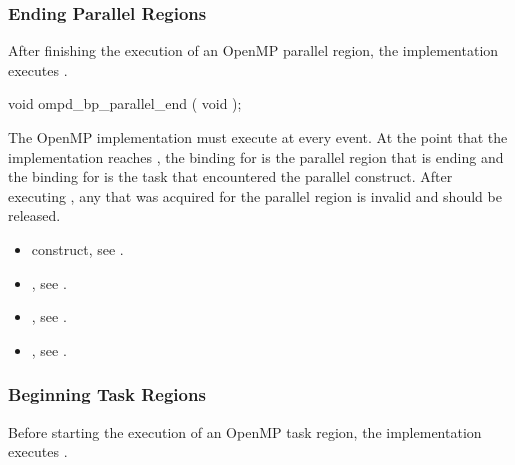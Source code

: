 \subsubsection{Ending Parallel Regions}
\label{subsubsec:ompd_bp_parallel_end}

\summary
After finishing the execution of an OpenMP parallel region, 
the implementation executes .

\format
\begin{cspecific}
\begin{ompSyntax}
void ompd_bp_parallel_end ( void );
\end{ompSyntax}
\end{cspecific}


\descr
The OpenMP implementation must execute  at 
every  event. At the point that the implementation reaches 
, the binding for  
is the parallel region that is ending and the binding for 
 is the task that encountered the 
parallel construct. After executing , any 
 that was acquired for the parallel region is 
invalid and should be released.

\crossreferences
\begin{itemize}
\item {} construct, see .

\item {}, 
see .

\item {}, 
see .

\item {}, 
see .
\end{itemize}



\subsubsection{Beginning Task Regions}
\label{subsubsec:ompd_bp_task_begin}

\summary
Before starting the execution of an OpenMP task region, 
the implementation executes .

